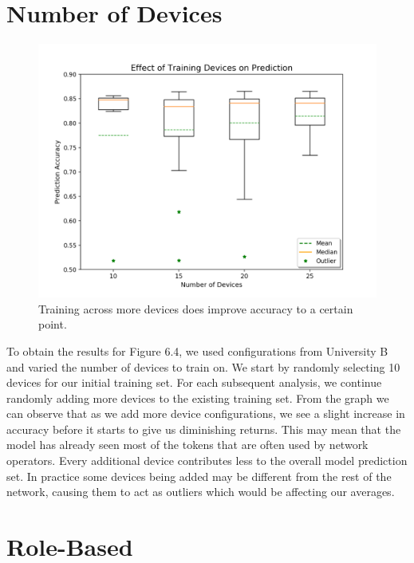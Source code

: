 \documentclass[../thesis.tex]{subfiles}
\begin{document}
\section{Number of Devices}
\begin{figure}[H]
	\centering
	\includegraphics[width=\textwidth]{device_analysis.png}
	\caption{Training across more devices does improve accuracy to a certain point.}
\end{figure}

To obtain the results for Figure 6.4, we used configurations from University B and varied the number of devices to train on. We start by randomly selecting 10 devices for our initial training set. For each subsequent analysis, we continue randomly adding more devices to the existing training set. From the graph we can observe that as we add more device configurations, we see a slight increase in accuracy before it starts to give us diminishing returns. This may mean that the model has already seen most of the tokens that are often used by network operators. Every additional device contributes less to the overall model prediction set. In practice some devices being added may be different from the rest of the network, causing them to act as outliers which would be affecting our averages.

\section{Role-Based}
\end{document}
